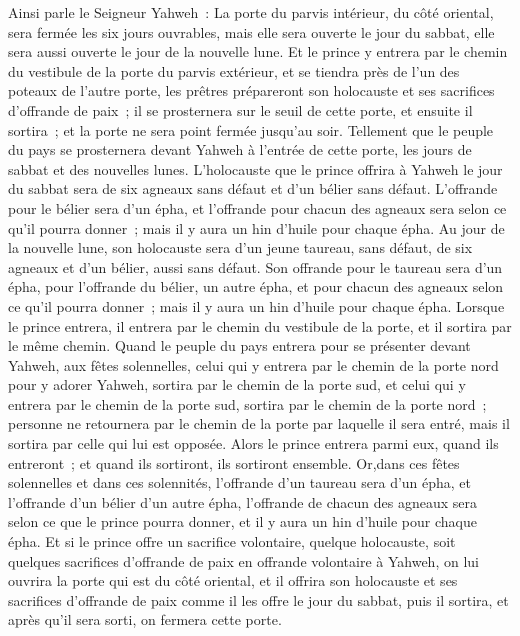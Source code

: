 \begin{multicols}{2}
\VerseOne{}Ainsi parle le Seigneur Yahweh~: La porte du parvis intérieur, du côté oriental, sera fermée les six jours ouvrables, mais elle sera ouverte le jour du sabbat, elle sera aussi ouverte le jour de la nouvelle lune.
Et le prince y entrera par le chemin du vestibule de la porte du parvis extérieur, et se tiendra près de l'un des poteaux de l'autre porte, les prêtres prépareront son holocauste et ses sacrifices d'offrande de paix~; il se prosternera sur le seuil de cette porte, et ensuite il sortira~; et la porte ne sera point fermée jusqu'au soir.
Tellement que le peuple du pays se prosternera devant Yahweh à l'entrée de cette porte, les jours de sabbat et des nouvelles lunes.
L'holocauste que le prince offrira à Yahweh le jour du sabbat sera de six agneaux sans défaut et d'un bélier sans défaut.
L'offrande pour le bélier sera d'un épha, et l'offrande pour chacun des agneaux sera selon ce qu'il pourra donner~; mais il y aura un hin d'huile pour chaque épha.
Au jour de la nouvelle lune, son holocauste sera d'un jeune taureau, sans défaut, de six agneaux et d'un bélier, aussi sans défaut.
Son offrande pour le taureau sera d'un épha, pour l'offrande du bélier, un autre épha, et pour chacun des agneaux selon ce qu'il pourra donner~; mais il y aura un hin d'huile pour chaque épha.
Lorsque le prince entrera, il entrera par le chemin du vestibule de la porte, et il sortira par le même chemin.
Quand le peuple du pays entrera pour se présenter devant Yahweh, aux fêtes solennelles, celui qui y entrera par le chemin de la porte nord pour y adorer Yahweh, sortira par le chemin de la porte sud, et celui qui y entrera par le chemin de la porte sud, sortira par le chemin de la porte nord~; personne ne retournera par le chemin de la porte par laquelle il sera entré, mais il sortira par celle qui lui est opposée.
Alors le prince entrera parmi eux, quand ils entreront~; et quand ils sortiront, ils sortiront ensemble.
Or,dans ces fêtes solennelles et dans ces solennités, l'offrande d'un taureau sera d'un épha, et l'offrande d'un bélier d'un autre épha, l'offrande de chacun des agneaux sera selon ce que le prince pourra donner, et il y aura un hin d'huile pour chaque épha.
Et si le prince offre un sacrifice volontaire, quelque holocauste, soit quelques sacrifices d'offrande de paix en offrande volontaire à Yahweh, on lui ouvrira la porte qui est du côté oriental, et il offrira son holocauste et ses sacrifices d'offrande de paix comme il les offre le jour du sabbat, puis il sortira, et après qu'il sera sorti, on fermera cette porte.

\end{multicols}
